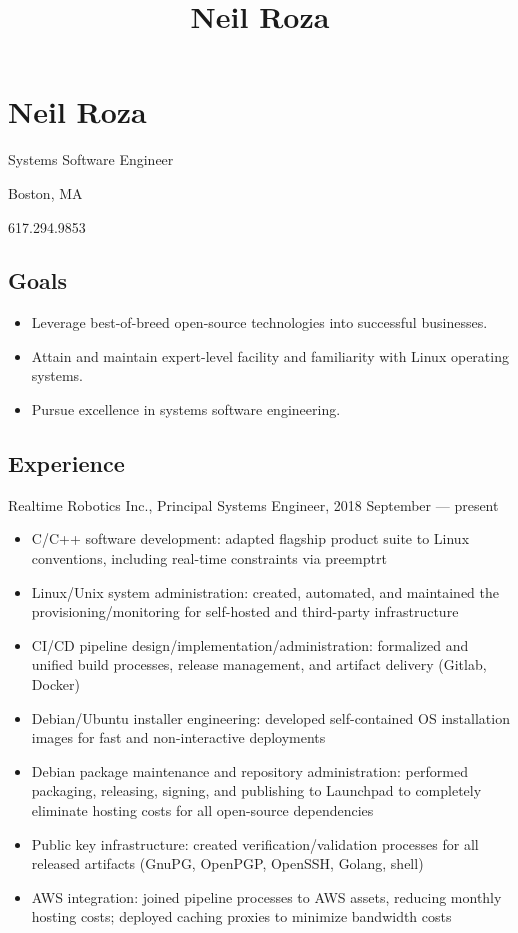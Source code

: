 \documentclass[letterpaper,12pt]{article}
\title{Neil Roza}
\begin{document}
\pagestyle{empty}

\section*{Neil Roza}

Systems Software Engineer

Boston, MA

617.294.9853



\subsection*{Goals}

\begin{itemize}
\item Leverage best-of-breed open-source technologies into successful
  businesses.
\item Attain and maintain expert-level facility and familiarity with Linux
  operating systems.
\item Pursue excellence in systems software engineering.
\end{itemize}

\subsection*{Experience}

Realtime Robotics Inc., Principal Systems Engineer, 2018 September --- present

\begin{itemize}
\item C/C++ software development: adapted flagship product suite to Linux
  conventions, including real-time constraints via preemptrt
\item Linux/Unix system administration: created, automated, and maintained the
  provisioning/monitoring for self-hosted and third-party infrastructure
\item CI/CD pipeline design/implementation/administration: formalized and
  unified build processes, release management, and artifact delivery (Gitlab,
  Docker)
\item Debian/Ubuntu installer engineering: developed self-contained OS
  installation images for fast and non-interactive deployments
\item Debian package maintenance and repository administration: performed
  packaging, releasing, signing, and publishing to Launchpad to completely
  eliminate hosting costs for all open-source dependencies
\item Public key infrastructure: created verification/validation processes for
  all released artifacts (GnuPG, OpenPGP, OpenSSH, Golang, shell)
\item AWS integration: joined pipeline processes to AWS assets, reducing
  monthly hosting costs; deployed caching proxies to minimize bandwidth costs
\end{itemize}
\end{document}
